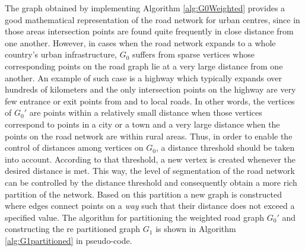 \documentclass[12pt]{article}
\theoremstyle{definition}
\begin{document}
The graph obtained by implementing Algorithm \ref{alg:G0Weighted} provides a good mathematical representation of the road network for urban centres, since in those areas intersection points are found quite frequently in close distance from one another. However, in cases when the road network expands to a whole country's urban infrastructure, $G_0$ suffers from sparse vertices whose corresponding points on the road graph lie at a very large distance from one another. An example of such case is a highway which typically expands over hundreds of kilometers and the only intersection points on the highway are very few entrance or exit points from and to local roads. In other words, the vertices of $G_0'$ are points within a relatively small distance when those vertices correspond to points in a city or a town and a very large distance when the points on the road network are within rural areas. Thus, in order to enable the control of distances among vertices on $G_0$, a distance threshold should be taken into account. According to that threshold, a new vertex is created whenever the desired distance is met. This way, the level of segmentation of the road network can be controlled by the distance threshold and consequently obtain a more rich partition of the network. Based on this partition a new graph is constructed where edges connect points on a \textit{way} such that their distance does not exceed a specified value. The algorithm for partitioning the weighted road graph $G_0'$ and constructing the re partitioned graph $G_1$ is shown in Algorithm \ref{alg:G1partitioned} in pseudo-code. 
\end{document}
